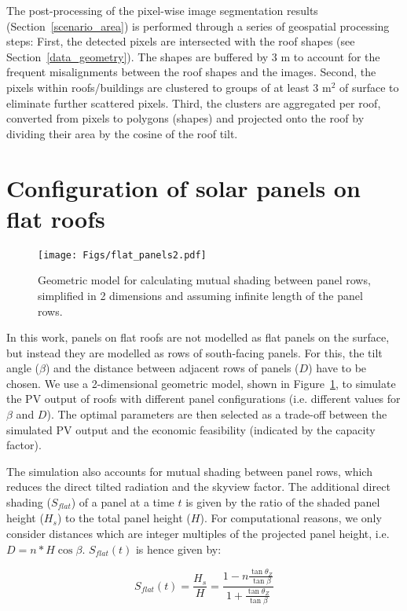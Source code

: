 The post-processing of the pixel-wise image segmentation results (Section~\ref{scenario_area}) is performed through a series of geospatial processing steps: First, the detected pixels are intersected with the roof shapes (see Section~\ref{data_geometry}). The shapes are buffered by 3 m to account for the frequent misalignments between the roof shapes and the images. Second, the pixels within roofs/buildings are clustered to groups of at least 3 m$^2$ of surface to eliminate further scattered pixels. Third, the clusters are aggregated per roof, converted from pixels to polygons (shapes) and projected onto the roof by dividing their area by the cosine of the roof tilt.


\section{Configuration of solar panels on flat roofs}
\label{app_flat}

\begin{figure}[tb]
	\centering
	\texttt{[image: Figs/flat\_panels2.pdf]}  
	\caption{Geometric model for calculating mutual shading between panel rows, simplified in 2 dimensions and assuming infinite length of the panel rows.}
	\label{fig:flat_concept}
\end{figure}

In this work, panels on flat roofs are not modelled as flat panels on the surface, but instead they are modelled as rows of south-facing panels. For this, the tilt angle ($\beta$) and the distance between adjacent rows of panels ($D$) have to be chosen. We use a 2-dimensional geometric model, shown in Figure~\ref{fig:flat_concept}, to simulate the PV output of roofs with different panel configurations (i.e. different values for $\beta$ and $D$). The optimal parameters are then selected as a trade-off between the simulated PV output and the economic feasibility (indicated by the capacity factor).

The simulation also accounts for mutual shading between panel rows, which reduces the direct tilted radiation and the skyview factor.
The additional direct shading ($S_{\mathit{flat}}$) of a panel at a time $t$ is given by the ratio of the shaded panel height ($H_s$) to the total panel height ($H$). For computational reasons, we only consider distances which are integer multiples of the projected panel height, i.e. $D=n*H \cos{\beta}$. $S_{\mathit{flat}}(t)$ is hence given by:

\begin{equation}
\label{eq:flat_Sh}
    S_{\mathit{flat}}(t) = \frac{H_s}{H} =  \frac{1 - n \frac{\tan{\theta_Z}}{\tan{\beta}}}
               {1 + \frac{\tan{\theta_Z}}{\tan{\beta}}}
\end{equation}

